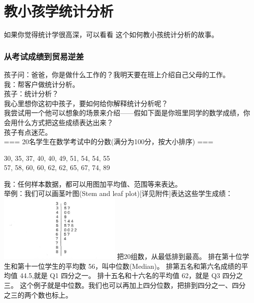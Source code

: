 \chapter{教小孩学统计分析} %

如果你觉得统计学很高深，可以看看 这个如何教小孩统计分析的故事。


\hypertarget{ux5982ux4f55ux753bux830eux53f6ux56festem-and-leaf-plot}{%
\subsection{从考试成绩到贸易逆差}\label{ux5982ux4f55ux753bux830eux53f6ux56festem-and-leaf-plot}}

孩子问：爸爸，你是做什么工作的？我明天要在班上介绍自己父母的工作。\\
我：帮客户做统计分析。\\
孩子：统计分析？\\
我心里想你这初中孩子，要如何给你解释统计分析呢？\\
我尝试用一个他可以想象的场景来介绍------假如下面是你班里同学的数学成绩，你会用什么方式把这些成绩表达出来？\\
孩子有点迷茫。\\
=== 20名学生在数学考试中的分数(满分为100分，按大小排序) ===

30, 35, 37, 40, 40, 49, 51, 54, 54, 55\\
57, 58, 60, 60, 62, 62, 65, 67, 74, 89

我：任何样本数据，都可以用图加平均值、范围等来表达。\\
举例：我们可以画茎叶图(Stem and leaf
plot){[}详见附件{]}表达这些学生成绩：\\


\includegraphics[width=6cm]{MA_FA2_10.png}
把20组数，从最低排到最高。 排在第十位学生和第十一位学生的平均数
56，叫中位数(Median)。 排第五名和第六名成绩的平均值 44.5,就是 Q1
四分之一。 排十五名和十六名的平均值 62，就是 Q3 四分之三。
这个例子就是中位数。我们也可以再加上四分位数，把排到四分之一、四分之三的两个数也标上。

